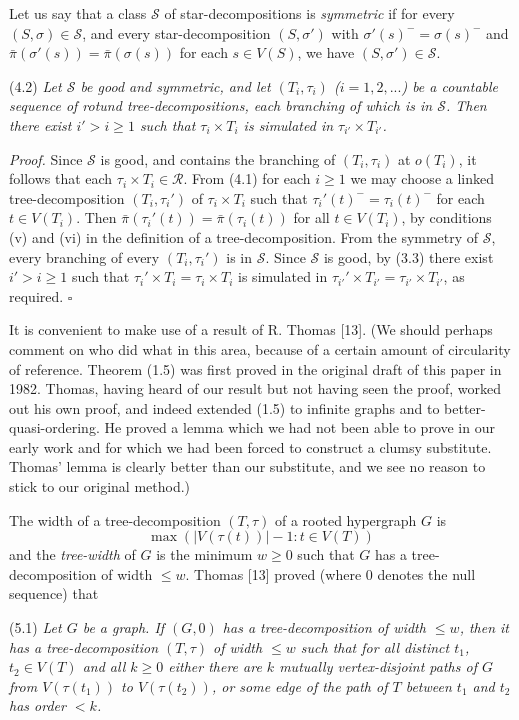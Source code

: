 Let us say that a class $\mathscr{S}$ of star-decompositions is \textit{symmetric} if for every $(S, \sigma) \in \mathscr{S}$, and every star-decomposition $(S, \sigma')$ with $\sigma'(s)^- = \sigma(s)^-$ and $\bar{\pi}(\sigma'(s)) = \bar{\pi}(\sigma(s))$ for each $s \in V(S)$, we have $(S, \sigma') \in \mathscr{S}$.

\stmt
(4.2) \textit{Let $\mathscr{S}$ be good and symmetric, and let $(T_i, \tau_i)$ ($i = 1, 2, ...$) be a countable sequence of rotund tree-decompositions, each branching of which is in $\mathscr{S}$. Then there exist $i' > i \ge 1$ such that $\tau_i \times T_i$ is simulated in $\tau_{i'} \times T_{i'}$.}

\textit{Proof.} Since $\mathscr{S}$ is good, and contains the branching of $(T_i, \tau_i)$ at $o(T_i)$, it follows that each $\tau_i \times T_i \in \mathscr{R}$. From (4.1) for each $i \ge 1$ we may choose a linked tree-decomposition $(T_i, \tau_i')$ of $\tau_i \times T_i$ such that $\tau_i'(t)^- = \tau_i(t)^-$ for each $t \in V(T_i)$. Then $\bar{\pi}(\tau_i'(t)) = \bar{\pi}(\tau_i(t))$ for all $t \in V(T_i)$, by conditions (v) and (vi) in the definition of a tree-decomposition. From the symmetry of $\mathscr{S}$, every branching of every $(T_i, \tau_i')$ is in $\mathscr{S}$. Since $\mathscr{S}$ is good, by (3.3) there exist $i' > i \ge 1$ such that $\tau_i' \times T_i = \tau_i \times T_i$ is simulated in $\tau_{i'}' \times T_{i'} = \tau_{i'} \times T_{i'}$, as required. $\square$


It is convenient to make use of a result of R. Thomas [13]. (We should perhaps comment on who did what in this area, because of a certain amount of circularity of reference. Theorem (1.5) was first proved in the original draft of this paper in 1982. Thomas, having heard of our result but not having seen the proof, worked out his own proof, and indeed extended (1.5) to infinite graphs and to better-quasi-ordering. He proved a lemma which we had not been able to prove in our early work and for which we had been forced to construct a clumsy substitute. Thomas' lemma is clearly better than our substitute, and we see no reason to stick to our original method.)

The width of a tree-decomposition $(T, \tau)$ of a rooted hypergraph $G$ is
\begin{equation*}
\max(|V(\tau(t))| - 1 : t \in V(T))
\end{equation*}
and the \textit{tree-width} of $G$ is the minimum $w \ge 0$ such that $G$ has a tree-decomposition of width $\le w$. Thomas [13] proved (where $0$ denotes the null sequence) that

\stmt
(5.1) \textit{Let $G$ be a graph. If $(G, 0)$ has a tree-decomposition of width $\le w$, then it has a tree-decomposition $(T, \tau)$ of width $\le w$ such that for all distinct $t_1$, $t_2 \in V(T)$ and all $k \ge 0$ either there are $k$ mutually vertex-disjoint paths of $G$ from $V(\tau(t_1))$ to $V(\tau(t_2))$, or some edge of the path of $T$ between $t_1$ and $t_2$ has order $< k$.}
